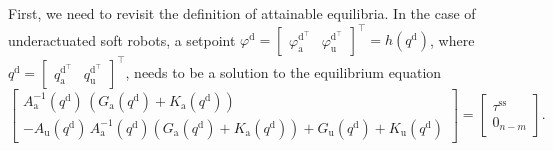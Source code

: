 First, we need to revisit the definition of attainable equilibria.
In the case of underactuated soft robots, a setpoint $\varphi^\mathrm{d} = \begin{bmatrix}
    \varphi_\mathrm{a}^{\mathrm{d}^\top} & \varphi_\mathrm{u}^{\mathrm{d}^\top}
\end{bmatrix}^\top = h(q^\mathrm{d})$, where $q^\mathrm{d} = \begin{bmatrix}
    q_\mathrm{a}^{\mathrm{d}^\top} & q_\mathrm{u}^{\mathrm{d}^\top}
\end{bmatrix}^\top$, needs to be a solution to the equilibrium equation~\citep{pustina2025analysis}
\begin{equation}
    \begin{bmatrix}
        A_\mathrm{a}^{-1}(q^\mathrm{d}) \, \left ( G_\mathrm{a}(q^\mathrm{d}) + K_\mathrm{a}(q^\mathrm{d}) \right )\\
        -A_\mathrm{u}(q^\mathrm{d}) \, A_\mathrm{a}^{-1}(q^\mathrm{d}) \left ( G_\mathrm{a}(q^\mathrm{d}) + K_\mathrm{a}(q^\mathrm{d}) \right ) + G_\mathrm{u}(q^\mathrm{d}) + K_\mathrm{u}(q^\mathrm{d})
    \end{bmatrix} = \begin{bmatrix}
        \tau^\mathrm{ss}\\
        0_{n-m}
    \end{bmatrix}.
\end{equation}

